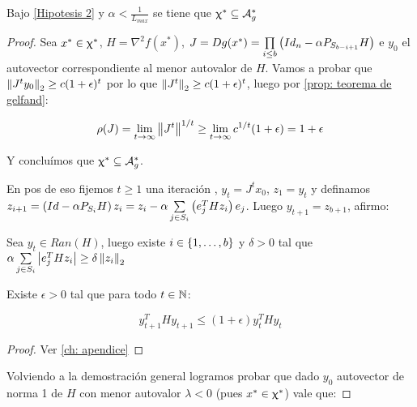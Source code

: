 \begin{proposition}
	\label{prop: DC los puntos silla estrictos son fijos inestables}
	Bajo \ref{Hipotesis 2} y $\alpha < \frac{1}{L_{max}}$ se tiene que $\upchi^* \subseteq \mathcal{A}_{g}^{*}$
\end{proposition}

\begin{proof}
	Sea $x^* \in \upchi^*$, $H = \nabla^2 f(x^*)$, 
	$J=Dg(x^*) = \prod\limits_{i \leq b}{\left(Id_n - \alpha P_{S_{b-i+1}}H\right)}$ e $y_0$ el autovector correspondiente al menor autovalor de $H$. Vamos a probar que $\left\lVert J^t y_0\right\rVert_2 \geq c(1+\epsilon)^t$ por lo que $\left\lVert J^t\right\rVert _2 \geq  c(1+\epsilon)^t$, luego por \ref{prop: teorema de gelfand}:
	
	\begin{equation*}
	\rho(J) = \lim\limits_{t \rightarrow \infty}{\left\lVert J^t\right\rVert^{1/t}} \geq \lim\limits_{t \rightarrow \infty}{c^{1/t} (1+\epsilon)} = 1 + \epsilon 
	\end{equation*}
	
	Y conclu\'imos que $\upchi^* \subseteq \mathcal{A}_{g}^{*}$.
	
	En pos de eso fijemos $t \geq 1$ una iteraci\'on , $y_t = J^t x_0$, $z_1 = y_t$ y definamos $z_{i+1} = \left(Id - \alpha P_{S_i}H\right)z_i = z_i - \alpha \sum\limits_{j \in S_i}{\left(e_j^T H z_i\right)e_j}$. Luego $y_{t+1} = z_{b+1}$, afirmo:
	
	\begin{claim}
		\label{claim1: DC los puntos silla estrictos son fijos inestables}
		Sea $y_t \in Ran(H)$, luego existe $i \in \left\lbrace1, \dots, b\right\rbrace$ y $\delta > 0$ tal que $\alpha \sum\limits_{j \in S_i}{\left\lvert e_j^T H z_i\right\rvert} \geq \delta \left\lVert z_i\right\rVert_2$
	\end{claim}
	
	\begin{lemma}
		\label{lemma1 : DC los puntos silla estrictos son fijos inestables}
		Existe $\epsilon >0$ tal que para todo $t \in {\mathbb{N}}$:
		
		\begin{equation*}
		\label{eq_1: DC los puntos silla estrictos son fijos inestables}
		y_{t+1}^THy_{t+1} \leq (1+\epsilon) y_{t}^THy_{t} 
		\end{equation*}
		
	\end{lemma}
	
	\begin{proof}
		Ver \ref{ch: apendice}
	\end{proof}

	Volviendo a la demostraci\'on general logramos probar que dado $y_0$ autovector de norma 1 de $H$ con menor autovalor $\lambda < 0$ (pues $x^* \in \upchi^*$) vale que:
	

\end{proof}
